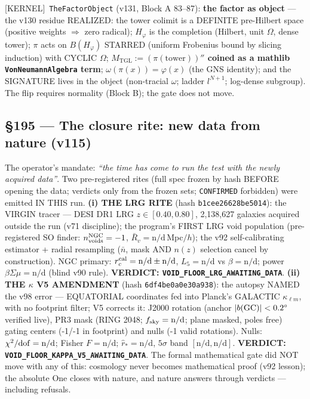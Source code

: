 \documentclass[11pt]{article}
\providecommand{\kernelmk}[1]{\textsf{[KERNEL]}~\texttt{#1}}\providecommand{\knownmk}[1]{\textsf{[KNOWN]}~{#1}}\providecommand{\statusmk}[1]{\textsf{[#1]}}
\theoremstyle{definition}\newtheorem{deriv}{Derivation}
\begin{document}
\kernelmk{TheFactorObject} (v131, Block A 83--87): \textbf{the factor as object} --- the v130 residue REALIZED: the tower colimit is a DEFINITE pre-Hilbert space (positive weights $\Rightarrow$ zero radical); $H_\varphi$ is the completion (Hilbert, unit $\Omega$, dense tower); $\pi$ acts on $B(H_\varphi)$ STARRED (uniform Frobenius bound by slicing induction) with CYCLIC $\Omega$; \textbf{$M_{\mathrm{TGL}}:=(\pi(\mathrm{tower}))''$ coined as a mathlib \texttt{VonNeumannAlgebra} term}; $\omega(\pi(x))=\varphi(x)$ (the GNS identity); and the SIGNATURE lives in the object (non-tracial $\omega$; ladder $l^{N+1}$; log-dense subgroup). The flip requires normality (Block B); the gate does not move.

\subsection*{\S195 --- The closure rite: new data from nature (v115)}The operator's mandate: \emph{``the time has come to run the test with the newly acquired data''}. Two pre-registered rites (full spec frozen by hash BEFORE opening the data; verdicts only from the frozen sets; \texttt{CONFIRMED} forbidden) were emitted IN THIS run. \textbf{(i) THE LRG RITE} (hash \texttt{b1cee26628be5014}): the VIRGIN tracer --- DESI DR1 LRG $z\in[0.40,0.80]$, 2,138,627 galaxies acquired outside the run (v71 discipline); the program's FIRST LRG void population (pre-registered SO finder: $n_{\rm voids}^{\rm NGC}=-1$, $\bar R_v=\text{n/d}$\,Mpc$/h$); the v92 self-calibrating estimator + radial resampling ($\bar n$, mask AND $n(z)$ selection cancel by construction). NGC primary: $r_c^{\rm cal}=\text{n/d}\pm\text{n/d}$, $L_5=\text{n/d}$ vs $\beta=\text{n/d}$; power $\beta\Sigma\mu=\text{n/d}$ (blind v90 rule). \textbf{VERDICT: \texttt{VOID\_FLOOR\_LRG\_AWAITING\_DATA}}. \textbf{(ii) THE $\kappa$ V5 AMENDMENT} (hash \texttt{6df4be0a0e30a938}): the autopsy NAMED the v98 error --- EQUATORIAL coordinates fed into Planck's GALACTIC $\kappa_{\ell m}$, with no footprint filter; V5 corrects it: J2000 rotation (anchor $|b({\rm GC})|<0.2^\circ$ verified live), PR3 mask (RING 2048; $f_{\rm sky}=\text{n/d}$; plane masked, poles free) gating centers (-1/-1 in footprint) and nulls (-1 valid rotations). Nulls: $\chi^2/{\rm dof}=\text{n/d}$; Fisher $F=\text{n/d}$; $\hat r_*=\text{n/d}$, $5\sigma$ band $[\text{n/d},\text{n/d}]$. \textbf{VERDICT: \texttt{VOID\_FLOOR\_KAPPA\_V5\_AWAITING\_DATA}}. The formal mathematical gate did NOT move with any of this: cosmology never becomes mathematical proof (v92 lesson); the absolute One closes with nature, and nature answers through verdicts --- including refusals.
\end{document}
